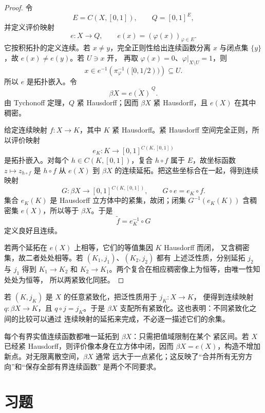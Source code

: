 \begin{proof}
令
\[
 E=C(X,[0,1]),\qquad Q=[0,1]^E,
\]
并定义评价映射
\[
 e:X\to Q,\qquad e(x)=(\varphi(x))_{\varphi\in E}.
\]
它按积拓扑的定义连续。若 \(x\ne y\)，完全正则性给出连续函数分离
\(x\) 与闭点集 \(\{y\}\)，故 \(e(x)\ne e(y)\)。若 \(U\ni x\) 开，
再取 \(\varphi(x)=0\)、\(\varphi|_{X\setminus U}=1\)，则
\[
 x\in e^{-1}\!\left(\pi_\varphi^{-1}([0,1/2))\right)\subseteq U.
\]
所以 \(e\) 是拓扑嵌入。令
\[
 \beta X=\overline{e(X)}^{\,Q}.
\]
由 Tychonoff 定理，\(Q\) 紧 Hausdorff；因而 \(\beta X\) 紧
Hausdorff，且 \(e(X)\) 在其中稠密。

给定连续映射 \(f:X\to K\)，其中 \(K\) 紧 Hausdorff。紧 Hausdorff
空间完全正则，所以评价映射
\[
 e_K:K\to[0,1]^{C(K,[0,1])}
\]
是拓扑嵌入。对每个 \(h\in C(K,[0,1])\)，复合 \(h\circ f\) 属于
\(E\)，故坐标函数 \(z\mapsto z_{h\circ f}\) 是 \(h\circ f\) 从
\(e(X)\) 到 \(\beta X\) 的连续延拓。把这些坐标合在一起，得到连续映射
\[
 G:\beta X\to[0,1]^{C(K,[0,1])},
 \qquad G\circ e=e_K\circ f.
\]
集合 \(e_K(K)\) 是 Hausdorff 立方体中的紧集，故闭；闭集
\(G^{-1}(e_K(K))\) 含稠密集 \(e(X)\)，所以等于 \(\beta X\)。于是
\[
 \widetilde f=e_K^{-1}\circ G
\]
定义良好且连续。

若两个延拓在 \(e(X)\) 上相等，它们的等值集因 \(K\) Hausdorff 而闭，
又含稠密集，故二者处处相等。若 \((K_1,j_1)\)、\((K_2,j_2)\) 都有
上述泛性质，分别延拓 \(j_2\) 与 \(j_1\) 得到 \(K_1\to K_2\) 和
\(K_2\to K_1\)。两个复合在相应稠密像上为恒等，由唯一性知处处为恒等，
所以两紧致化同胚。
\end{proof}

若 \((K,j_K)\) 是 \(X\) 的任意紧致化，把泛性质用于 \(j_K:X\to K\)，
便得到连续映射 \(q:\beta X\to K\)，且 \(q\circ j=j_K\)。于是
\(\beta X\) 支配所有紧致化。这也表明：不同紧致化之间的比较可以通过
连续映射的延拓来完成，不必逐一描述它们的余集。

每个有界实值连续函数都唯一延拓到 \(\beta X\)：只需把值域限制在某个
紧区间。若 \(X\) 已经紧 Hausdorff，则评价像本身在立方体中闭，因而
\(\beta X=e(X)\)，构造不增加新点。对无限离散空间，\(\beta X\) 通常
远大于一点紧化；这反映了“合并所有无穷方向”和“保存全部有界连续函数”
是两个不同要求。

\section*{习题}

